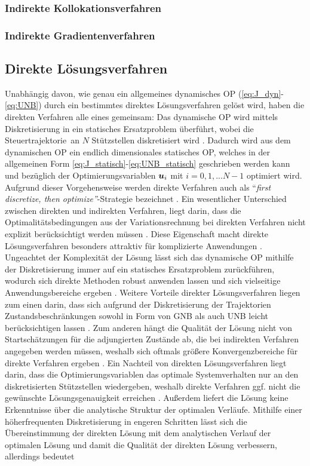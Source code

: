 \subsubsection{Indirekte Kollokationsverfahren}\label{subsubsec:Kollokationsverfahren_indirekt}
\subsubsection{Indirekte Gradientenverfahren}\label{subsubsec:Gradientenverfahren_indirekt}
\subsection{Direkte Lösungsverfahren}\label{subsec:Direkt}
Unabhängig davon, wie genau ein allgemeines dynamisches \gls{OP} (\eqref{eq:J_dyn}- \eqref{eq:UNB}) durch ein bestimmtes direktes Lösungsverfahren gelöst wird, haben die direkten Verfahren alle eines gemeinsam: Das dynamische \gls{OP} wird mittels Diskretisierung in ein statisches Ersatzproblem überführt, wobei die Steuertrajektorie \uoft\,an $N$ Stützstellen diskretisiert wird \cite{KnutGraichen.2012}. Dadurch wird aus dem dynamischen \gls{OP} ein endlich dimensionales statisches \gls{OP}, welches in der allgemeinen Form \eqref{eq:J_statisch}-\eqref{eq:UNB_statisch} geschrieben werden kann und bezüglich der Optimierungsvariablen $\boldsymbol{u}_i$ mit $i=0,1,...N-1$ optimiert wird. Aufgrund dieser Vorgehensweise werden direkte Verfahren auch als ``\textit{first discretize, then optimize''}-Strategie bezeichnet \cite{Papageorgiou.2012}. Ein wesentlicher Unterschied zwischen direkten und indirekten Verfahren, liegt darin, dass die Optimalitätsbedingungen aus der Variationsrechnung bei direkten Verfahren nicht explizit berücksichtigt werden müssen \cite{Rathgeber.2016}. Diese Eigenschaft macht direkte Lösungsverfahren besonders attraktiv für komplizierte Anwendungen \cite{Betts.1998}. Ungeachtet der Komplexität der Lösung lässt sich das dynamische \gls{OP} mithilfe der Diskretisierung immer auf ein statisches Ersatzproblem zurückführen, wodurch sich direkte Methoden robust anwenden lassen und sich vielseitige Anwendungsbereiche ergeben \cite{Betts.1998}. Weitere Vorteile direkter Lösungsverfahren liegen zum einen darin, dass sich aufgrund der Diskretisierung der Trajektorien Zustandsbeschränkungen sowohl in Form von \gls{GNB} als auch \gls{UNB} leicht berücksichtigen lassen \cite{KnutGraichen.2012}. Zum anderen hängt die Qualität der Lösung nicht von Startschätzungen für die adjungierten Zustände ab, die bei indirekten Verfahren angegeben werden müssen, weshalb sich oftmals größere Konvergenzbereiche für direkte Verfahren ergeben \cite{KnutGraichen.2012}. Ein Nachteil von direkten Lösungsverfahren liegt darin, dass die Optimierungsvariablen das optimale Systemverhalten nur an den diskretisierten Stützstellen wiedergeben, weshalb direkte Verfahren ggf. nicht die gewünschte Lösungsgenauigkeit erreichen \cite{Papageorgiou.2012}. Außerdem liefert die Lösung keine Erkenntnisse über die analytische Struktur der optimalen Verläufe. Mithilfe einer höherfrequenten Diskretisierung in engeren Schritten lässt sich die Übereinstimmung der direkten Lösung mit dem analytischen Verlauf der optimalen Lösung und damit die Qualität der direkten Lösung verbessern, allerdings bedeutet 